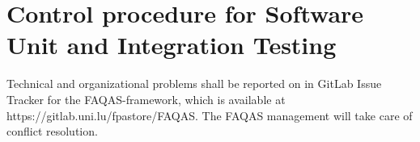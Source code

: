 
\chapter{Control procedure for Software Unit and Integration Testing}
\label{chapter:control:procedure}

Technical and organizational problems shall be reported on in GitLab Issue Tracker for the FAQAS-framework, which is available at https://gitlab.uni.lu/fpastore/FAQAS.
The FAQAS management will take care of conflict resolution.
